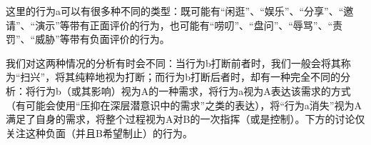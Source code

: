 \begin{explain}
这里的行为a可以有很多种不同的类型：既可能有“闲逛”、“娱乐”、“分享”、“邀请”、“演示”等带有正面评价的行为，也可能有“唠叨”、“盘问”、“辱骂”、“责罚”、“威胁”等带有负面评价的行为。

我们对这两种情况的分析有时会不同：当行为b打断前者时，我们一般会将其称为“扫兴”，将其纯粹地视为打断；而行为b打断后者时，却有一种完全不同的分析：将行为b（或其影响）视为A的一种需求，将行为a视为A表达该需求的方式（有可能会使用“压抑在深层潜意识中的需求”之类的表达），将“行为a消失”视为A满足了自身的需求，将整个过程视为A对B的一次指挥（或是控制）。下方的讨论仅关注这种负面（并且B希望制止）的行为。
\end{explain}
